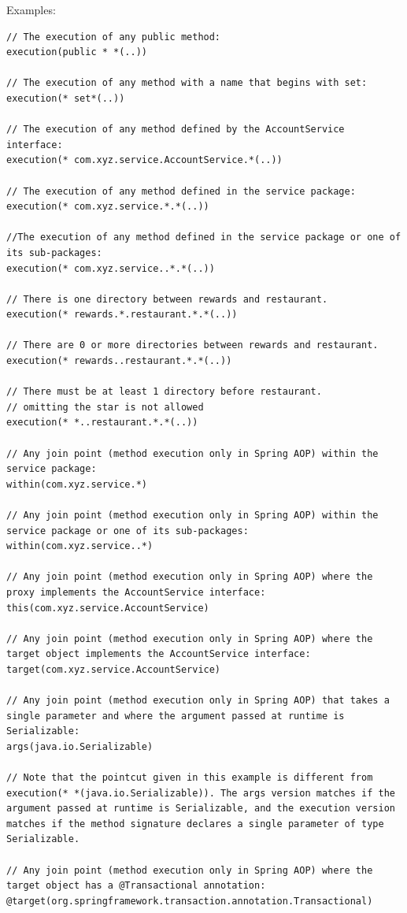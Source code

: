 \documentclass{scrartcl}
\begin{document}
Examples:

\begin{lstlisting}
// The execution of any public method:
execution(public * *(..))

// The execution of any method with a name that begins with set:
execution(* set*(..))

// The execution of any method defined by the AccountService interface:
execution(* com.xyz.service.AccountService.*(..))

// The execution of any method defined in the service package:
execution(* com.xyz.service.*.*(..))

//The execution of any method defined in the service package or one of its sub-packages:
execution(* com.xyz.service..*.*(..))

// There is one directory between rewards and restaurant.
execution(* rewards.*.restaurant.*.*(..))

// There are 0 or more directories between rewards and restaurant.
execution(* rewards..restaurant.*.*(..))

// There must be at least 1 directory before restaurant.
// omitting the star is not allowed
execution(* *..restaurant.*.*(..))

// Any join point (method execution only in Spring AOP) within the service package:
within(com.xyz.service.*)

// Any join point (method execution only in Spring AOP) within the service package or one of its sub-packages:
within(com.xyz.service..*)

// Any join point (method execution only in Spring AOP) where the proxy implements the AccountService interface:
this(com.xyz.service.AccountService)

// Any join point (method execution only in Spring AOP) where the target object implements the AccountService interface:
target(com.xyz.service.AccountService)

// Any join point (method execution only in Spring AOP) that takes a single parameter and where the argument passed at runtime is Serializable:
args(java.io.Serializable)

// Note that the pointcut given in this example is different from execution(* *(java.io.Serializable)). The args version matches if the argument passed at runtime is Serializable, and the execution version matches if the method signature declares a single parameter of type Serializable.

// Any join point (method execution only in Spring AOP) where the target object has a @Transactional annotation:
@target(org.springframework.transaction.annotation.Transactional)


\end{lstlisting}
\end{document}
